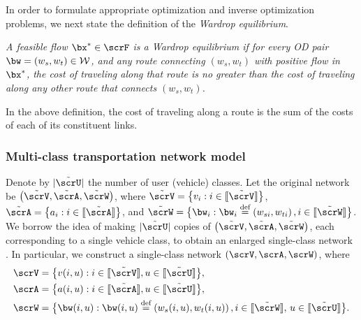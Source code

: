 \documentclass[3p]{elsarticle}
\newcommand*{\defeq}{\stackrel{\text{def}}{=}}
\begin{document}
In order to formulate appropriate optimization and inverse optimization
problems, we next state the definition of the \textit{Wardrop equilibrium}.
	
\begin{defi} \label{cdc16-def1} \emph{A
    feasible flow $\bx^* \in \scrF$ is a {\em Wardrop equilibrium}
    if for every OD pair $\bw = \left( {{w_s},{w_t}} \right) \in
    \mathcal{W}$, and any route connecting $(w_s,w_t)$ with positive
    flow in $\bx^*$, the cost of traveling along that route is no
    greater than the cost of traveling along any other route that
    connects $(w_s,w_t)$. }
\end{defi}
	
In the above definition, the cost of traveling along a route is the sum
of the costs of each of its constituent links.
	
\subsubsection{Multi-class transportation network
  model} \label{sec:multi-mod}
	
Denote by $|\tilde \scrU|$ the number of user (vehicle) classes. Let the
original network be $\big( {\tilde {\scrV},\tilde {\scrA}}, \tilde
{\scrW} \big)$, where $\tilde {\scrV} = \big\{ {{v_i}: i \in
  [\kern-0.15em[ \tilde\scrV ]\kern-0.15em]} \big\}$, $\tilde {\scrA} =
\big\{ {{a_{i}}: i \in [\kern-0.15em[ \tilde\scrA ]\kern-0.15em]}
\big\}$, and $\tilde {\scrW} = \big\{ {{\bw_i}:{\bw_i} \defeq \left(
    {{w_{si}},{w_{ti}}} \right),i \in [\kern-0.15em[ \tilde \scrW
  ]\kern-0.15em]} \big\}$.  We borrow the idea of making $|\tilde
\scrU|$ copies of $\big( {\tilde {\scrV},\tilde {\scrA}}, \tilde {\scrW}
\big)$, each corresponding to a single vehicle class, to obtain an
enlarged single-class network \cite{dafermos1972traffic}. In particular,
we construct a single-class network $\left( \scrV, \scrA,\scrW \right)$,
where
\begin{align}
\scrV &= \big\{ {v(i,u): i \in [\kern-0.15em[ \tilde\scrV 
		]\kern-0.15em], u \in [\kern-0.15em[ \tilde\scrU
		]\kern-0.15em]} \big\}, \label{nodes} \\
	\scrA &= \big\{ {a(i,u): i \in [\kern-0.15em[ \tilde\scrA 
		]\kern-0.15em], u \in [\kern-0.15em[ \tilde\scrU 
		]\kern-0.15em]} \big\}, \label{links} \\
	\scrW &= \big\{ \bw(i,u):\bw(i,u) \defeq \left( {w_s(i,u),w_t(i,u)} \right), i \in [\kern-0.15em[ \tilde\scrW 
	]\kern-0.15em], \,u \in [\kern-0.15em[ \tilde\scrU 
	]\kern-0.15em] \big\}. \label{ods}
\end{align}
	
\end{document}
